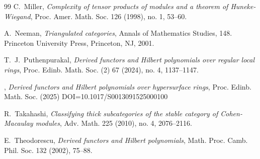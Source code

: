\documentclass{amsart}
\theoremstyle{plain}
\theoremstyle{definition}
\theoremstyle{remark}
\begin{document}
\begin{thebibliography} {99}
C.~Miller,
\emph{Complexity of tensor products of modules and a theorem of Huneke-Wiegand},
Proc. Amer. Math. Soc. 126 (1998), no. 1, 53--60.

 A.~Neeman,
 \emph{Triangulated categories},
  Annals of Mathematics Studies, 148. Princeton University Press, Princeton, NJ, 2001.







T.~J.~Puthenpurakal,
\emph{Derived functors and Hilbert polynomials over regular local rings},
Proc. Edinb. Math. Soc. (2)   67 (2024), no. 4, 1137--1147.

\bysame,
\emph{Derived functors and Hilbert polynomials over hypersurface rings},
Proc. Edinb. Math. Soc. (2025)  DOI={10.1017/S0013091525000100}


R.~Takahashi,
\emph{Classifying thick subcategories of the stable category of Cohen-Macaulay modules},
Adv. Math. 225 (2010), no. 4, 2076--2116.

E.~Theodorescu,
\emph{Derived functors and Hilbert polynomials},
Math. Proc. Camb. Phil. Soc. 132 (2002), 75--88.


\end{thebibliography}
\end{document}
